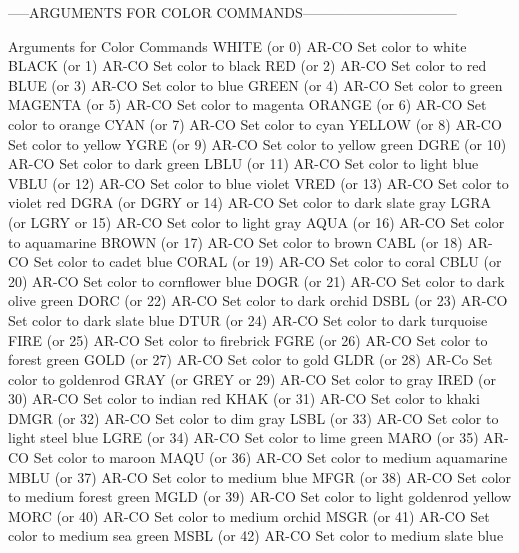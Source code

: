 -----ARGUMENTS FOR COLOR COMMANDS---------------------------------

Arguments for Color Commands
WHITE   (or 0)              AR-CO Set color to white
BLACK   (or 1)              AR-CO Set color to black
RED     (or 2)              AR-CO Set color to red
BLUE    (or 3)              AR-CO Set color to blue
GREEN   (or 4)              AR-CO Set color to green
MAGENTA (or 5)              AR-CO Set color to magenta
ORANGE  (or 6)              AR-CO Set color to orange
CYAN    (or 7)              AR-CO Set color to cyan
YELLOW  (or 8)              AR-CO Set color to yellow
YGRE    (or 9)              AR-CO Set color to yellow green
DGRE    (or 10)             AR-CO Set color to dark green
LBLU    (or 11)             AR-CO Set color to light blue
VBLU    (or 12)             AR-CO Set color to blue violet
VRED    (or 13)             AR-CO Set color to violet red
DGRA    (or DGRY or 14)     AR-CO Set color to dark slate gray
LGRA    (or LGRY or 15)     AR-CO Set color to light gray
AQUA    (or 16)             AR-CO Set color to aquamarine
BROWN   (or 17)             AR-CO Set color to brown
CABL    (or 18)             AR-CO Set color to cadet blue
CORAL   (or 19)             AR-CO Set color to coral
CBLU    (or 20)             AR-CO Set color to cornflower blue
DOGR    (or 21)             AR-CO Set color to dark olive green
DORC    (or 22)             AR-CO Set color to dark orchid
DSBL    (or 23)             AR-CO Set color to dark slate blue
DTUR    (or 24)             AR-CO Set color to dark turquoise
FIRE    (or 25)             AR-CO Set color to firebrick
FGRE    (or 26)             AR-CO Set color to forest green
GOLD    (or 27)             AR-CO Set color to gold
GLDR    (or 28)             AR-Co Set color to goldenrod
GRAY    (or GREY or 29)     AR-CO Set color to gray
IRED    (or 30)             AR-CO Set color to indian red
KHAK    (or 31)             AR-CO Set color to khaki
DMGR    (or 32)             AR-CO Set color to dim gray
LSBL    (or 33)             AR-CO Set color to light steel blue
LGRE    (or 34)             AR-CO Set color to lime green
MARO    (or 35)             AR-CO Set color to maroon
MAQU    (or 36)             AR-CO Set color to medium aquamarine
MBLU    (or 37)             AR-CO Set color to medium blue
MFGR    (or 38)             AR-CO Set color to medium forest green
MGLD    (or 39)             AR-CO Set color to light goldenrod yellow
MORC    (or 40)             AR-CO Set color to medium orchid
MSGR    (or 41)             AR-CO Set color to medium sea green
MSBL    (or 42)             AR-CO Set color to medium slate blue
